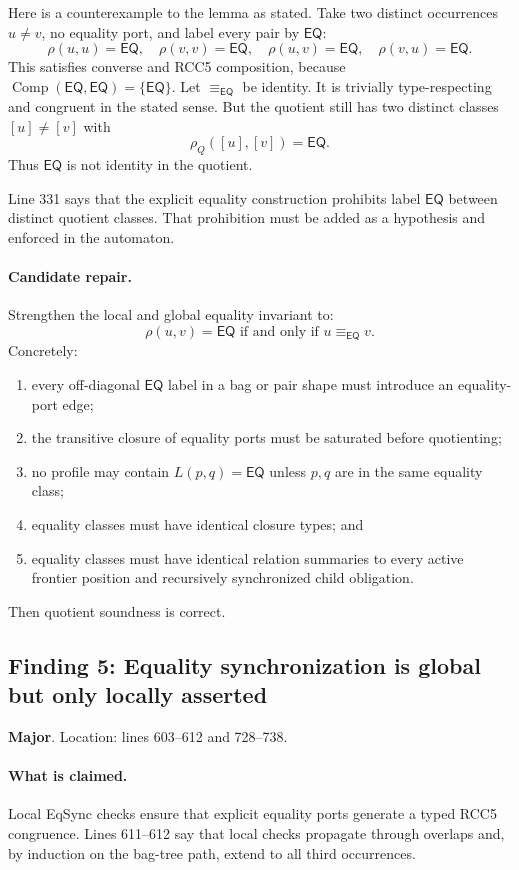 \documentclass[11pt]{article}
\newcommand{\EQ}{\mathsf{EQ}}
\newcommand{\Comp}{\operatorname{Comp}}
\newcommand{\Major}{\textbf{\textcolor{maj}{Major}}}
\begin{document}
Here is a counterexample to the lemma as stated.  Take two distinct occurrences $u\ne v$, no equality port, and label every pair by $\EQ$:
\[
  \rho(u,u)=\EQ,
  \quad \rho(v,v)=\EQ,
  \quad \rho(u,v)=\EQ,
  \quad \rho(v,u)=\EQ.
\]
This satisfies converse and RCC5 composition, because $\Comp(\EQ,\EQ)=\{\EQ\}$.  Let $\equiv_{\EQ}$ be identity.  It is trivially type-respecting and congruent in the stated sense.  But the quotient still has two distinct classes $[u]\ne[v]$ with
\[
  \rho_Q([u],[v])=\EQ.
\]
Thus $\EQ$ is not identity in the quotient.

Line 331 says that the explicit equality construction prohibits label $\EQ$ between distinct quotient classes.  That prohibition must be added as a hypothesis and enforced in the automaton.

\paragraph{Candidate repair.}
Strengthen the local and global equality invariant to:
\[
  \rho(u,v)=\EQ \text{ if and only if } u\equiv_{\EQ}v.
\]
Concretely:
\begin{enumerate}[label=(E\arabic*)]
\item every off-diagonal $\EQ$ label in a bag or pair shape must introduce an equality-port edge;
\item the transitive closure of equality ports must be saturated before quotienting;
\item no profile may contain $L(p,q)=\EQ$ unless $p,q$ are in the same equality class;
\item equality classes must have identical closure types; and
\item equality classes must have identical relation summaries to every active frontier position and recursively synchronized child obligation.
\end{enumerate}
Then quotient soundness is correct.

\subsection{Finding 5: Equality synchronization is global but only locally asserted}

\noindent\Major.  Location: lines 603--612 and 728--738.

\paragraph{What is claimed.}
Local \textsf{EqSync} checks ensure that explicit equality ports generate a typed RCC5 congruence.  Lines 611--612 say that local checks propagate through overlaps and, by induction on the bag-tree path, extend to all third occurrences.
\end{document}
